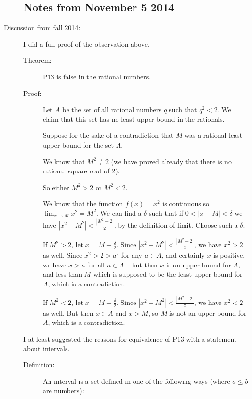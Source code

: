 \documentclass[12pt]{article}
\begin{document}
\begin{description}
\subsection{Notes from November 5 2014}

\item[Discussion from fall 2014:]  I did a full proof of the observation above.

\begin{description}

\item[Theorem:]  P13 is false in the rational numbers.

\item[Proof:]  Let $A$ be the set of all rational numbers $q$ such that $q^2<2$.  We claim that this set has no least upper bound in the rationals.

Suppose for the sake of a contradiction that $M$ was a rational least upper bound for the set $A$.

We know that $M^2 \neq 2$ (we have proved already that there is no rational square root of 2).

So either $M^2>2$ or $M^2<2$.

We know that the function $f(x)=x^2$ is continuous so $\lim_{x \rightarrow M}x^2 = M^2$.   We can find a $\delta$ such that if $0<|x-M|<\delta$ we have $|x^2-M^2| < \frac{|M^2-2|}2$, by the definition of limit.   Choose such a $\delta$.

If $M^2>2$, let $x=M-\frac\delta2$.   Since $|x^2-M^2| < \frac{|M^2-2|}2$, we have $x^2>2$ as well.  Since $x^2>2>a^2$ for any $a \in A$, and certainly $x$ is positive, we
have $x>a$ for all $a \in A$ -- but then $x$ is an upper bound for $A$, and less than $M$ which is supposed to be the least upper bound for $A$, which is a contradiction.

If $M^2<2$, let $x = M+\frac\delta2$.   Since $|x^2-M^2| < \frac{|M^2-2|}2$, we have $x^2<2$ as well.  But then $x \in A$ and $x>M$, so $M$ is not an upper bound for $A$, which is a contradiction.

\end{description}

I at least suggested the reasons for equivalence of P13 with a statement about intervals.

\begin{description}

\item[Definition:]  An interval is a set defined in one of the following ways (where $a \leq b$ are numbers):


\end{description}
\end{description}
\end{document}
